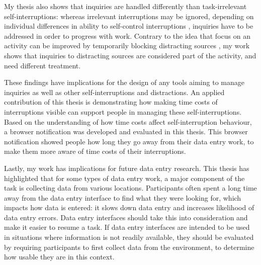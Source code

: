 My thesis also shows that inquiries are handled differently than task-irrelevant self-interruptions: whereas irrelevant interruptions may be ignored, depending on individual differences in ability to self-control interruptions \citep{Lyngs2018}, inquiries have to be addressed in order to progress with work. Contrary to the idea that focus on an activity can be improved by temporarily blocking distracting sources \citep{Kim2017}, my work shows that inquiries to distracting sources are considered part of the activity, and need different treatment. 

These findings have implications for the design of any tools aiming to manage inquiries as well as other self-interruptions and distractions. An applied contribution of this thesis is demonstrating how making time costs of interruptions visible can support people in managing these self-interruptions. Based on the understanding of how time costs affect self-interruption behaviour, a browser notification was developed and evaluated in this thesis. This browser notification showed people how long they go away from their data entry work, to make them more aware of time costs of their interruptions. %

Lastly, my work has implications for future data entry research. This thesis has highlighted that for some types of data entry work, a major component of the task is collecting data from various locations. Participants often spent a long time away from the data entry interface to find what they were looking for, which impacts how data is entered: it slows down data entry and increases likelihood of data entry errors. Data entry interfaces should take this into consideration and make it easier to resume a task. If data entry interfaces are intended to be used in situations where information is not readily available, they should be evaluated by requiring participants to first collect data from the environment, to determine how usable they are in this context. 




